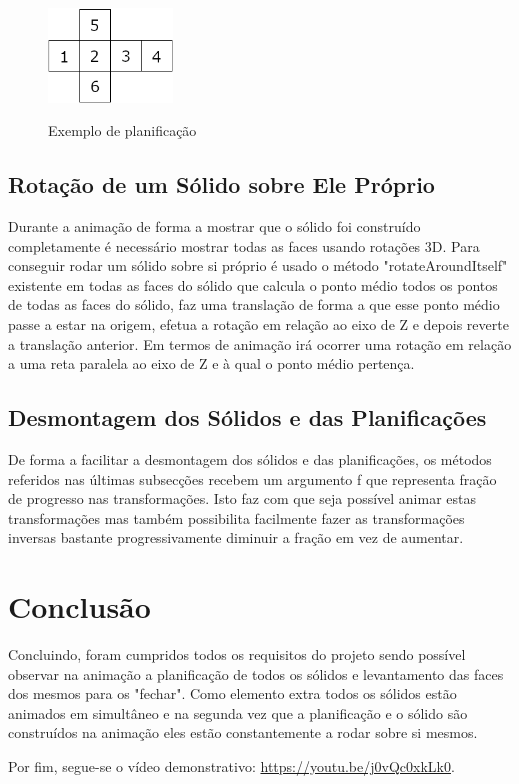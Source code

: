 \documentclass{report}
\begin{document}
\begin{figure}[H]
   \centering
   \includegraphics[width=1.3in]{Cube.PNG}
   \label{fig:cubo}
   \caption{Exemplo de planificação}
\end{figure}

\subsection{Rotação de um Sólido sobre Ele Próprio}

\quad Durante a animação de forma a mostrar que o sólido foi construído completamente é necessário mostrar todas as faces usando rotações 3D. Para conseguir rodar um sólido sobre si próprio é usado o método "rotateAroundItself" existente em todas as faces do sólido que calcula o ponto médio todos os pontos de todas as faces do sólido, faz uma translação de forma a que esse ponto médio passe a estar na origem, efetua a rotação em relação ao eixo de Z e depois reverte a translação anterior. Em termos de animação irá ocorrer uma rotação em relação a uma reta paralela ao eixo de Z e à qual o ponto médio pertença.

\subsection{Desmontagem dos Sólidos e das Planificações}

\quad De forma a facilitar a desmontagem dos sólidos e das planificações, os métodos referidos nas últimas subsecções recebem um argumento f que representa fração de progresso nas transformações. Isto faz com que seja possível animar estas transformações mas também possibilita facilmente fazer as transformações inversas bastante progressivamente diminuir a fração em vez de aumentar.

\section{Conclusão}

\quad Concluindo, foram cumpridos todos os requisitos do projeto sendo possível observar na animação a planificação de todos os sólidos e levantamento das faces dos mesmos para os "fechar". Como elemento extra todos os sólidos estão animados em simultâneo e na segunda vez que a planificação e o sólido são construídos na animação eles estão constantemente a rodar sobre si mesmos.

Por fim, segue-se o vídeo demonstrativo: \url{https://youtu.be/j0vQc0xkLk0}.
\end{document}
